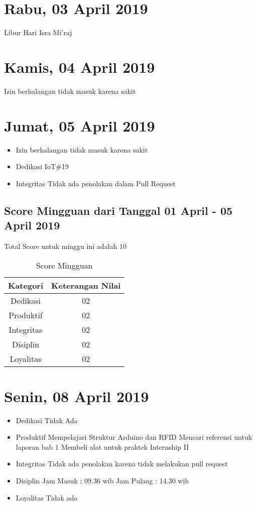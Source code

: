 \section{Rabu, 03 April 2019}
Libur Hari Isra Mi'raj

\section{Kamis, 04 April 2019}
Izin berhalangan tidak masuk karena sakit

\section{Jumat, 05 April 2019}
\begin{itemize}
\item Izin berhalangan tidak masuk karena sakit
\item Dedikasi
\subitem IoT\#19
\item Integritas
 \subitem Tidak ada penolakan dalam Pull Request
\end{itemize}

\subsection{Score Mingguan dari Tanggal 01 April - 05 April 2019}
Total Score untuk minggu ini adalah 10

\begin{table}[h]
\caption{Score Mingguan}
\centering
\begin{tabular}{|c|c|}
\hline
\textbf{Kategori}&\textbf{Keterangan Nilai}\\
\hline
Dedikasi&02\\
\hline
Produktif&02\\
\hline
Integritas&02\\
\hline
Disiplin&02\\
\hline
Loyalitas&02\\
\hline
\end{tabular}
\label{table:score mingguan}
\end{table}

\section{Senin, 08 April 2019}
\begin{itemize}
\item Dedikasi
\subitem Tidak Ada
\item Produktif
  \subitem Mempelajari Struktur Arduino dan RFID
  \subitem Mencari referensi untuk laporan bab 1
  \subitem Membeli alat untuk praktek Internship II
\item Integritas
  \subitem Tidak ada penolakan karena tidak melakukan pull request
\item Disiplin
  \subitem Jam Masuk : 09.36 wib
  \subitem Jam Pulang : 14.30 wib
\item Loyalitas
  \subitem Tidak ada
\end{itemize}

